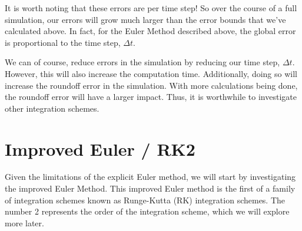 \documentclass[10pt, openany, titlepage]{book}
\theoremstyle{definition}
\begin{document}
It is worth noting that these errors are per time step! So over the course of a full simulation, our errors will grow much larger than the error bounds that we’ve calculated above. In fact, for the Euler Method described above, the global error is proportional to the time step, $\Delta t$.

We can of course, reduce errors in the simulation by reducing our time step, $\Delta t$. However, this will also increase the computation time. Additionally, doing so will increase the \gls{roundoff error} in the simulation. With more calculations being done, the \gls{roundoff error} will have a larger impact. Thus, it is worthwhile to investigate other integration schemes.

\section{Improved Euler / RK2}
Given the limitations of the explicit Euler method, we will start by investigating the improved Euler Method. This improved Euler method is the first of a family of integration schemes known as Runge-Kutta (RK) integration schemes. The number 2 represents the order of the integration scheme, which we will explore more later.
\end{document}
